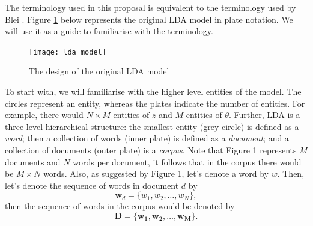 \documentclass{mprop}
\begin{document}
\par The terminology used in this proposal is equivalent to the terminology used by Blei \cite{blei_2012}. Figure \ref{fig:lda} below represents the original LDA model in plate notation. We will use it as a guide to familiarise with the terminology.   
\begin{figure}[H]
  \centering
  \texttt{[image: lda\_model]}
  \caption{The design of the original LDA model}
  \label{fig:lda}
\end{figure}

\par To start with, we will familiarise with the higher level entities of the model. The circles represent an entity, whereas the plates indicate the number of entities. For example, there would $N \times M$ entities of $z$ and $M$ entities of $\theta$. Further, LDA is a three-level hierarchical structure: the smallest entity (grey circle) is defined as a \textit{word}; then a collection of words (inner plate) is defined as a \textit{document}; and a collection of documents (outer plate) is a \textit{corpus}. Note that Figure 1 represents $M$ documents and $N$ words per document, it follows that in the corpus there would be $M \times N$ words. Also, as suggested by Figure 1, let's denote a word by $w$. Then, let's denote the sequence of words in document $d$ by 
\begin{equation*}
\mathbf{w}_d = \{w_1, w_2, \dots, w_N\},
\end{equation*}
then the sequence of words in the corpus would be denoted by
\begin{equation*}
\mathcal{\mathbf{D}} = \{\mathbf{w_1}, \mathbf{w_2}, \dots, \mathbf{w_M}\}.
\end{equation*}
 
\end{document}
